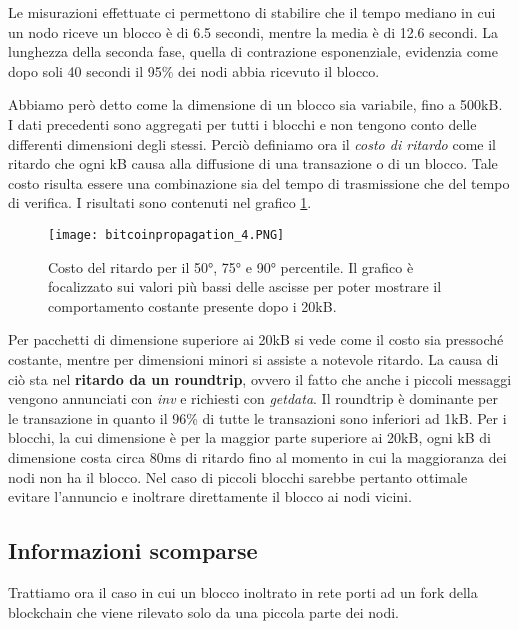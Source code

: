 Le misurazioni effettuate ci permettono di stabilire che il tempo mediano in cui un nodo riceve un blocco è di 6.5 secondi, mentre la media è di 12.6 secondi. La lunghezza della seconda fase, quella di contrazione esponenziale, evidenzia come dopo soli 40 secondi il 95\% dei nodi abbia ricevuto il blocco.

Abbiamo però detto come la dimensione di un blocco sia variabile, fino a 500kB. I dati precedenti sono aggregati per tutti i blocchi e non tengono conto delle differenti dimensioni degli stessi. Perciò definiamo ora il \emph{costo di ritardo} come il ritardo che ogni kB causa alla diffusione di una transazione o di un blocco. Tale costo risulta essere una combinazione sia del tempo di trasmissione che del tempo di verifica. I risultati sono contenuti nel grafico \ref{bitcoinpropagation_4}.

\begin{figure}[htbp]
\centering
\texttt{[image: bitcoinpropagation\_4.PNG]}
\caption{Costo del ritardo per il 50°, 75° e 90° percentile. Il grafico è focalizzato sui valori più bassi delle ascisse per poter mostrare il comportamento costante presente dopo i 20kB.\label{bitcoinpropagation_4}}
\end{figure}

Per pacchetti di dimensione superiore ai 20kB si vede come il costo sia pressoché costante, mentre per dimensioni minori si assiste a notevole ritardo. La causa di ciò sta nel \textbf{ritardo da un roundtrip}, ovvero il fatto che anche i piccoli messaggi vengono annunciati con \emph{inv} e richiesti con \emph{getdata}. Il roundtrip è dominante per le transazione in quanto il 96\% di tutte le transazioni sono inferiori ad 1kB. Per i blocchi, la cui dimensione è per la maggior parte superiore ai 20kB, ogni kB di dimensione costa circa 80ms di ritardo fino al momento in cui la maggioranza dei nodi non ha il blocco. %
Nel caso di piccoli blocchi sarebbe pertanto ottimale evitare l'annuncio e inoltrare direttamente il blocco ai nodi vicini.

\subsection{Informazioni scomparse}\label{informazioni-scomparse}

Trattiamo ora il caso in cui un blocco inoltrato in rete porti ad un fork della blockchain che viene rilevato solo da una piccola parte dei nodi.

